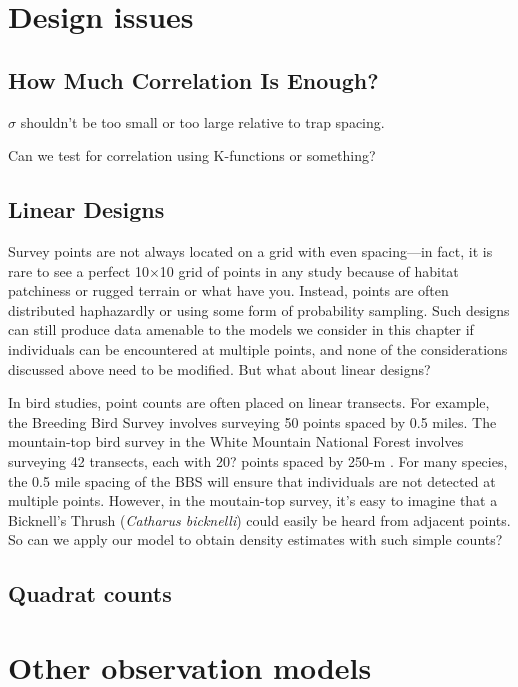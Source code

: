 \section{Design issues}

\subsection{How Much Correlation Is Enough?}

$\sigma$ shouldn't be too small or too large relative to trap spacing.

Can we test for correlation using K-functions or something?

\subsection{Linear Designs}

Survey points are not always located on a grid with even spacing---in
fact, it is rare to see a perfect 10$\times$10 grid of points in any
study because of habitat patchiness or rugged terrain or what have
you. Instead, points are often distributed haphazardly or using some form of
probability sampling. Such designs can still produce data amenable to
the models we consider in this chapter if individuals can be
encountered at multiple points, and none of the considerations
discussed above need to be modified. But what about linear designs?

In bird studies, point counts are often placed on linear transects. For
example, the Breeding Bird Survey involves surveying 50 points spaced
by 0.5 miles. The mountain-top bird survey in the White Mountain
National Forest involves surveying 42 transects, each with 20? points
spaced by 250-m \citep{king_etal:2008}. For many species, the 0.5 mile
spacing of the BBS will ensure that individuals are not detected at
multiple points. However, in the moutain-top survey, it's easy to
imagine that a Bicknell's Thrush (\emph{Catharus bicknelli}) could
easily be heard from adjacent points. So can we apply our model to
obtain density estimates with such simple counts?



\subsection{Quadrat counts}




\section{Other observation models}

